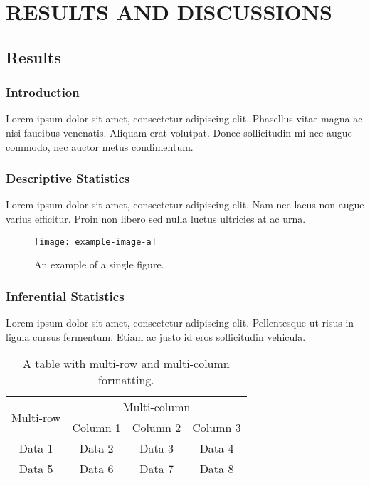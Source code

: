 \chapter{RESULTS AND DISCUSSIONS}
\section{Results}
\subsection{Introduction}
Lorem ipsum dolor sit amet, consectetur adipiscing elit. Phasellus vitae magna ac nisi faucibus venenatis. Aliquam erat volutpat. Donec sollicitudin mi nec augue commodo, nec auctor metus condimentum.

\subsection{Descriptive Statistics}
Lorem ipsum dolor sit amet, consectetur adipiscing elit. Nam nec lacus non augue varius efficitur. \cite{smith2020understanding} Proin non libero sed nulla luctus ultricies at ac urna.
\begin{figure}[ht]
    \centering
    \texttt{[image: example-image-a]}
    \caption{An example of a single figure.}
    \label{fig:single1}
\end{figure}
\subsection{Inferential Statistics}
Lorem ipsum dolor sit amet, consectetur adipiscing elit. Pellentesque ut risus in ligula cursus fermentum. Etiam ac justo id eros sollicitudin vehicula.

\begin{table}[ht]
    \centering
    \begin{tabular}{|c|c|c|c|}
        \hline
        \multirow{2}{*}{Multi-row} & \multicolumn{3}{c|}{Multi-column} \\
        \cline{2-4}
         & Column 1 & Column 2 & Column 3 \\
        \hline
        Data 1 & Data 2 & Data 3 & Data 4 \\
        \hline
        Data 5 & Data 6 & Data 7 & Data 8 \\
        \hline
    \end{tabular}
    \caption{A table with multi-row and multi-column formatting.}
    \label{tab:multi}
\end{table}
